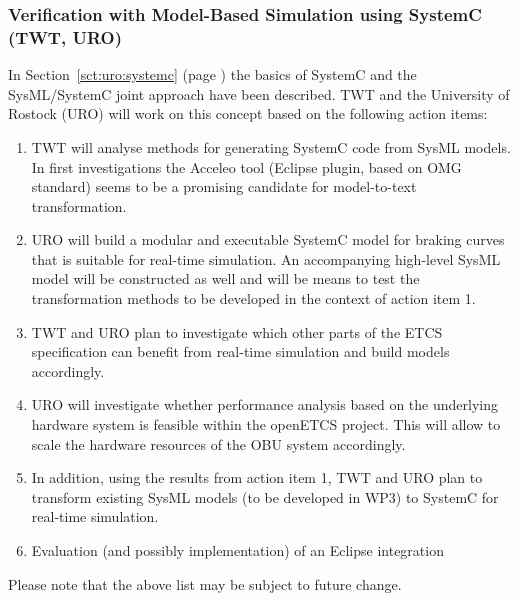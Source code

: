 \documentclass{template/openetcs_report}
\begin{document}
\subsubsection{Verification with Model-Based Simulation using SystemC (TWT, URO)}
\label{sec:model-based-sim-openETCS}

In Section~\ref{sct:uro:systemc} (page \pageref{sct:uro:systemc}) the
basics of SystemC and the SysML/SystemC joint approach have been
described. TWT and the University of Rostock (URO) will work on this
concept based on the following action items:

\begin{enumerate}
  \item TWT will analyse methods for generating SystemC code from
  SysML models. In first investigations the Acceleo tool (Eclipse
  plugin, based on OMG standard) seems to be a promising candidate for
  model-to-text transformation.
  \item URO will build a modular and executable SystemC model for
  braking curves that is suitable for real-time simulation. An
  accompanying high-level SysML model will be constructed as well and
  will be means to test the transformation methods to be developed in
  the context of action item 1.
  \item TWT and URO plan to investigate which other parts of the ETCS
  specification can benefit from real-time simulation and build models
  accordingly.
  \item URO will investigate whether performance analysis based on the
  underlying hardware system is feasible within the openETCS
  project. This will allow to scale the hardware resources of the OBU
  system accordingly.
  \item In addition, using the results from action item 1, TWT and URO
    plan to transform existing SysML models (to be developed in WP3)
    to SystemC for real-time simulation.
  \item Evaluation (and possibly implementation) of an Eclipse
  integration
\end{enumerate}

Please note that the above list may be subject to future change.
\end{document}
